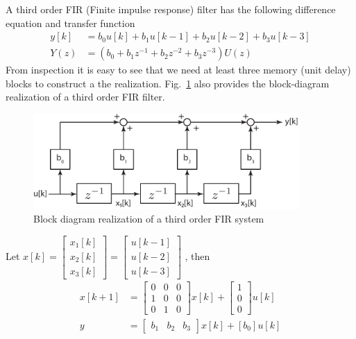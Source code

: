 \documentclass[twoside]{article}
\begin{document}
A third order FIR (Finite impulse response) filter has the following
difference equation and transfer function
%
\begin{align*}
y[k] &= b_0 u[k] + b_1 u[k-1] + b_2 u[k-2] + b_3 u[k-3] \\ 
Y(z) &= \left( b_0 + b_1 z^{-1} + b_2 z^{-2} + b_3 z^{-3} \right) U(z)
\end{align*}
%
From inspection it is easy to see that we need at least three memory (unit delay) 
blocks to construct a the realization. Fig.~\ref{fig:FIR} also 
provides the block-diagram realization of a third order FIR filter.
%
\begin{figure}[h]
    \centering
      \includegraphics[width=0.9\textwidth]{FIR}
    \caption{Block diagram realization of a third order FIR system}
        \label{fig:FIR}
\end{figure}
%
Let $x[k] = \left[ \begin{array}{c} x_1[k] \\ x_2[k] \\ x_3[k]
\end{array} \right] = \left[ \begin{array}{c} u[k-1] \\ u[k-2] \\
                               u[k-3] \end{array} \right] $ , then 
%
\begin{align*}
 x[k+1] &= \left[  \begin{array}{ccc} 0 & 0 & 0 \\ 1 & 0 & 0 \\ 0 & 1 & 0 \end{array} \right] x[k] 
 +  \left[  \begin{array}{c} 1 \\ 0 \\ 0  \end{array} \right] u[k]
 \\
 y &= \left[  \begin{array}{ccc} b_1 & b_2 & b_3 \end{array} \right] x[k] + [b_0] u[k]
\end{align*}
%
\end{document}
